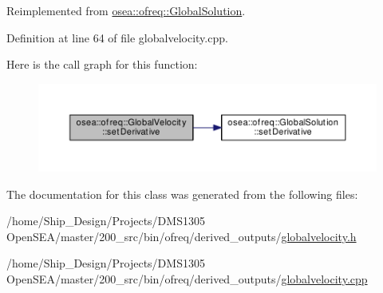 Reimplemented from \hyperlink{classosea_1_1ofreq_1_1_global_solution_a537163391f1f55d073720b20f69acfa5}{osea\-::ofreq\-::\-Global\-Solution}.



Definition at line 64 of file globalvelocity.\-cpp.



Here is the call graph for this function\-:\nopagebreak
\begin{figure}[H]
\begin{center}
\leavevmode
\includegraphics[width=350pt]{classosea_1_1ofreq_1_1_global_velocity_a11229a6dbc7f85f3c321b5eddb127f10_cgraph}
\end{center}
\end{figure}




The documentation for this class was generated from the following files\-:\begin{DoxyCompactItemize}
\item 
/home/\-Ship\-\_\-\-Design/\-Projects/\-D\-M\-S1305 Open\-S\-E\-A/master/200\-\_\-src/bin/ofreq/derived\-\_\-outputs/\hyperlink{globalvelocity_8h}{globalvelocity.\-h}\item 
/home/\-Ship\-\_\-\-Design/\-Projects/\-D\-M\-S1305 Open\-S\-E\-A/master/200\-\_\-src/bin/ofreq/derived\-\_\-outputs/\hyperlink{globalvelocity_8cpp}{globalvelocity.\-cpp}\end{DoxyCompactItemize}
